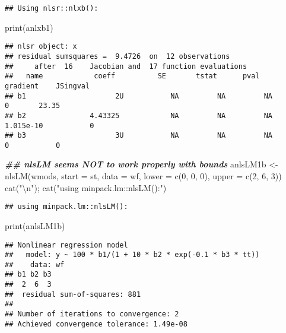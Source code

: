 \documentclass[
]{article}
\newenvironment{Shaded}{\begin{snugshade}}{\end{snugshade}}
\newcommand{\AttributeTok}[1]{\textcolor[rgb]{0.77,0.63,0.00}{#1}}
\newcommand{\DecValTok}[1]{\textcolor[rgb]{0.00,0.00,0.81}{#1}}
\newcommand{\DocumentationTok}[1]{\textcolor[rgb]{0.56,0.35,0.01}{\textbf{\textit{#1}}}}
\newcommand{\FunctionTok}[1]{\textcolor[rgb]{0.00,0.00,0.00}{#1}}
\newcommand{\NormalTok}[1]{#1}
\newcommand{\OtherTok}[1]{\textcolor[rgb]{0.56,0.35,0.01}{#1}}
\newcommand{\SpecialCharTok}[1]{\textcolor[rgb]{0.00,0.00,0.00}{#1}}
\newcommand{\StringTok}[1]{\textcolor[rgb]{0.31,0.60,0.02}{#1}}
\begin{document}
\begin{verbatim}
## Using nlsr::nlxb():
\end{verbatim}

\begin{Shaded}
\begin{Highlighting}[]
\FunctionTok{print}\NormalTok{(anlxb1)}
\end{Highlighting}
\end{Shaded}

\begin{verbatim}
## nlsr object: x 
## residual sumsquares =  9.4726  on  12 observations
##     after  16    Jacobian and  17 function evaluations
##   name            coeff          SE       tstat      pval      gradient    JSingval   
## b1                     2U           NA         NA         NA           0       23.35  
## b2               4.43325            NA         NA         NA   1.015e-10           0  
## b3                     3U           NA         NA         NA           0           0
\end{verbatim}

\begin{Shaded}
\begin{Highlighting}[]
\DocumentationTok{\#\# nlsLM seems NOT to work properly with bounds}
\NormalTok{anlsLM1b }\OtherTok{\textless{}{-}} \FunctionTok{nlsLM}\NormalTok{(wmods, }\AttributeTok{start =}\NormalTok{ st, }\AttributeTok{data =}\NormalTok{ wf, }\AttributeTok{lower =} \FunctionTok{c}\NormalTok{(}\DecValTok{0}\NormalTok{, }\DecValTok{0}\NormalTok{, }\DecValTok{0}\NormalTok{), }\AttributeTok{upper =} \FunctionTok{c}\NormalTok{(}\DecValTok{2}\NormalTok{, }\DecValTok{6}\NormalTok{, }\DecValTok{3}\NormalTok{))}
\FunctionTok{cat}\NormalTok{(}\StringTok{"}\SpecialCharTok{\textbackslash{}n}\StringTok{"}\NormalTok{); }\FunctionTok{cat}\NormalTok{(}\StringTok{"using minpack.lm::nlsLM():"}\NormalTok{)}
\end{Highlighting}
\end{Shaded}

\begin{verbatim}
## using minpack.lm::nlsLM():
\end{verbatim}

\begin{Shaded}
\begin{Highlighting}[]
\FunctionTok{print}\NormalTok{(anlsLM1b)}
\end{Highlighting}
\end{Shaded}

\begin{verbatim}
## Nonlinear regression model
##   model: y ~ 100 * b1/(1 + 10 * b2 * exp(-0.1 * b3 * tt))
##    data: wf
## b1 b2 b3 
##  2  6  3 
##  residual sum-of-squares: 881
## 
## Number of iterations to convergence: 2 
## Achieved convergence tolerance: 1.49e-08
\end{verbatim}
\end{document}

